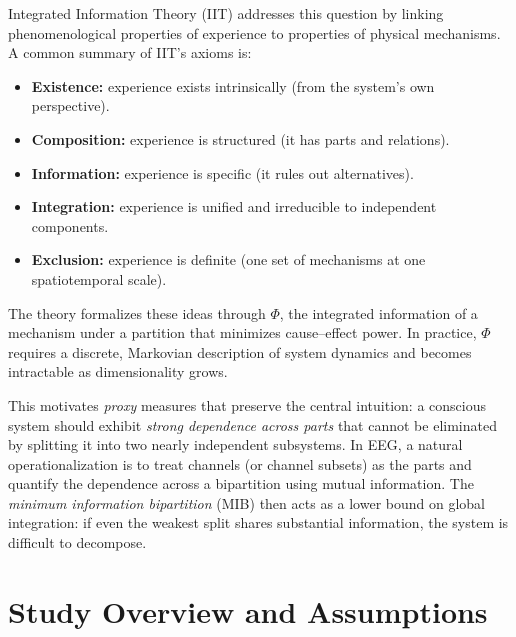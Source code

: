 \documentclass[11pt]{article}
\begin{document}
Integrated Information Theory (IIT) addresses this question by linking phenomenological properties of experience to properties of physical mechanisms. A common summary of IIT's axioms is:
\begin{itemize}[leftmargin=*]
    \item \textbf{Existence:} experience exists intrinsically (from the system's own perspective).
    \item \textbf{Composition:} experience is structured (it has parts and relations).
    \item \textbf{Information:} experience is specific (it rules out alternatives).
    \item \textbf{Integration:} experience is unified and irreducible to independent components.
    \item \textbf{Exclusion:} experience is definite (one set of mechanisms at one spatiotemporal scale).
\end{itemize}
The theory formalizes these ideas through $\Phi$, the integrated information of a mechanism under a partition that minimizes cause--effect power. In practice, $\Phi$ requires a discrete, Markovian description of system dynamics and becomes intractable as dimensionality grows.

This motivates \emph{proxy} measures that preserve the central intuition: a conscious system should exhibit \emph{strong dependence across parts} that cannot be eliminated by splitting it into two nearly independent subsystems. In EEG, a natural operationalization is to treat channels (or channel subsets) as the parts and quantify the dependence across a bipartition using mutual information. The \emph{minimum information bipartition} (MIB) then acts as a lower bound on global integration: if even the weakest split shares substantial information, the system is difficult to decompose.

\section{Study Overview and Assumptions}
\end{document}
